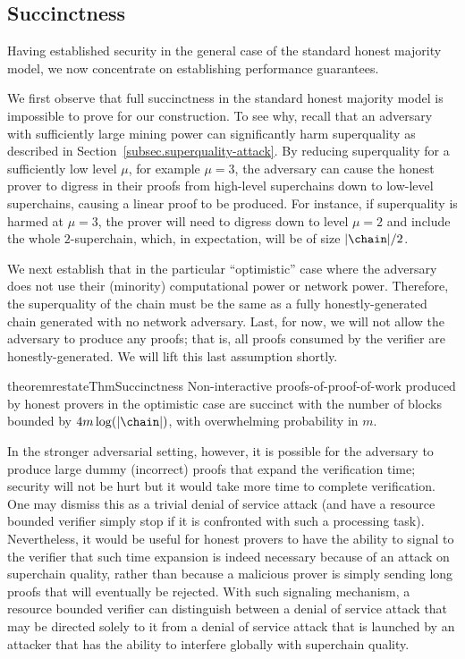 \subsection{Succinctness}
\label{sec.succinctness}
Having established security in the general case of the standard honest majority
model, we now concentrate on establishing performance guarantees.

We first observe that full succinctness in the standard honest majority model is
impossible to prove for our construction. To see why, recall that an adversary
with sufficiently large mining power can significantly harm superquality as
described in %
Section~\ref{subsec.superquality-attack}. By reducing
 superquality for a sufficiently low level $\mu$, for example $\mu = 3$, the
adversary can cause the honest prover to digress in their proofs from high-level
superchains down to low-level superchains, causing a linear proof to be
produced.
For instance, if superquality is harmed at $\mu = 3$, the prover will
need to digress down to level $\mu = 2$ and include the whole $2$-superchain,
which, in expectation, will be of size $|\chain|/2$.

We next establish that in the particular 
``optimistic'' case where the adversary does not use their (minority)
computational power or network power. Therefore, the superquality of the chain
must be the same as a fully honestly-generated chain generated with no network
adversary. Last, for now, we will not allow the adversary to produce any proofs;
that is, all proofs consumed by the verifier are honestly-generated.
We will lift this last assumption shortly.

\begin{restatable}{theorem}{restateThmSuccinctness}
    \label{thm.succinctness}
    Non-interactive proofs-of-proof-of-work produced by honest provers in the
    optimistic case are succinct with the number of blocks bounded by $4m
    \log(|\chain|)$, with overwhelming probability in $m$.
\end{restatable}

In the stronger adversarial setting, however, it is possible for the
adversary to produce large dummy (incorrect) proofs that
expand the verification time; security will not be hurt but it would take more time to complete verification. One may dismiss this as a trivial denial of
service attack (and have a resource bounded
verifier simply stop  if it is confronted with such a processing task).
%
Nevertheless, it would be useful for honest provers
to have the ability to signal to the
verifier that such time expansion is indeed necessary because
of an attack on superchain quality, rather than because
a malicious prover is simply sending long proofs that will eventually
be rejected. With such signaling mechanism, a resource bounded verifier can
distinguish between a denial of service attack that may be directed solely to it
from  a denial of service attack that  is launched by an attacker
that has the ability to  interfere globally with superchain quality.

